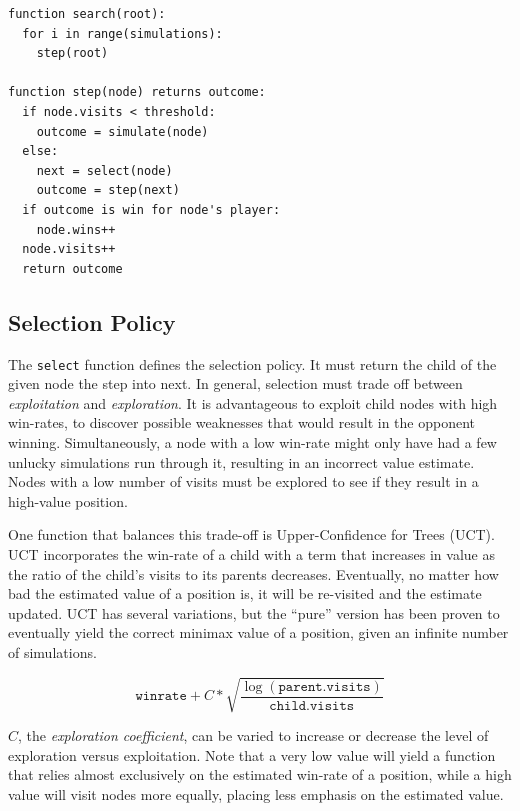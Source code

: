 \documentclass[11pt]{report}
\begin{document}
\begin{verbatim}
function search(root):
  for i in range(simulations):
    step(root)
		
function step(node) returns outcome:
  if node.visits < threshold:
    outcome = simulate(node)
  else:
    next = select(node)
    outcome = step(next)
  if outcome is win for node's player:
    node.wins++
  node.visits++
  return outcome
\end{verbatim}

\subsection{Selection Policy}
The \texttt{select} function defines the selection policy. It must return the child of the given node the step into next. In general, selection must trade off between \emph{exploitation} and \emph{exploration}. It is advantageous to exploit child nodes with high win-rates, to discover possible weaknesses that would result in the opponent winning. Simultaneously, a node with a low win-rate might only have had a few unlucky simulations run through it, resulting in an incorrect value estimate. Nodes with a low number of visits must be explored to see if they result in a high-value position.

One function that balances this trade-off is Upper-Confidence for Trees (UCT). UCT incorporates the win-rate of a child with a term that increases in value as the ratio of the child's visits to its parents decreases. Eventually, no matter how bad the estimated value of a position is, it will be re-visited and the estimate updated. UCT has several variations, but the ``pure'' version has been proven to eventually yield the correct minimax value of a position, given an infinite number of simulations\cite{gelly2006exploration}.

\[
	\texttt{winrate} + C*\sqrt{\frac{\log{(\texttt{parent.visits})}}{\texttt{child.visits}}}
\]

$C$, the \emph{exploration coefficient}, can be varied to increase or decrease the level of exploration versus exploitation. Note that a very low value will yield a function that relies almost exclusively on the estimated win-rate of a position, while a high value will visit nodes more equally, placing less emphasis on the estimated value.
\end{document}
